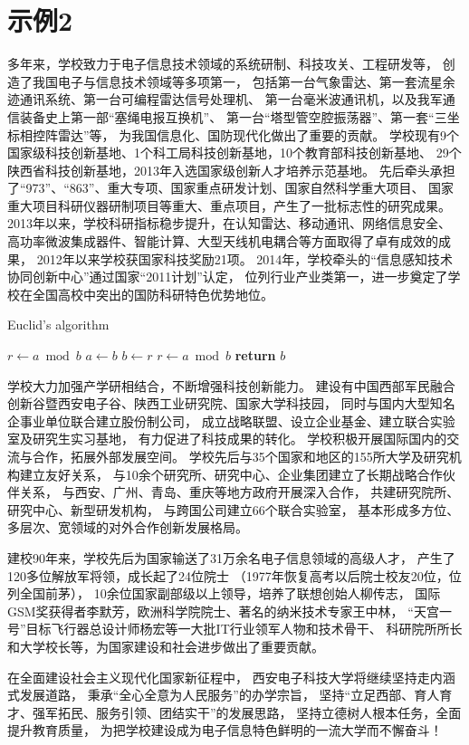 \section{示例2}
多年来，学校致力于电子信息技术领域的系统研制、科技攻关、工程研发等，
创造了我国电子与信息技术领域等多项第一，
包括第一台气象雷达、第一套流星余迹通讯系统、第一台可编程雷达信号处理机、
第一台毫米波通讯机，以及我军通信装备史上第一部“塞绳电报互换机”、
第一台“塔型管空腔振荡器”、第一套“三坐标相控阵雷达”等，
为我国信息化、国防现代化做出了重要的贡献。
学校现有9个国家级科技创新基地、1个科工局科技创新基地，10个教育部科技创新基地、
29个陕西省科技创新基地，2013年入选国家级创新人才培养示范基地。
先后牵头承担了“973”、“863”、重大专项、国家重点研发计划、国家自然科学重大项目、
国家重大项目科研仪器研制项目等重大、重点项目，产生了一批标志性的研究成果。
2013年以来，学校科研指标稳步提升，在认知雷达、移动通讯、网络信息安全、
高功率微波集成器件、智能计算、大型天线机电耦合等方面取得了卓有成效的成果，
2012年以来学校获国家科技奖励21项。
2014年，学校牵头的“信息感知技术协同创新中心”通过国家“2011计划”认定，
位列行业产业类第一，进一步奠定了学校在全国高校中突出的国防科研特色优势地位。
\begin{algorithm}
\caption{Euclid's algorithm}\label{euclid}
\begin{algorithmic}[1]
\State $r\gets a\bmod b$
\State $a\gets b$
\State $b\gets r$
\State $r\gets a\bmod b$
\EndWhile\label{euclidendwhile}
\State \textbf{return} $b$
\EndProcedure
\end{algorithmic}
\end{algorithm}
\par
学校大力加强产学研相结合，不断增强科技创新能力。
建设有中国西部军民融合创新谷暨西安电子谷、陕西工业研究院、国家大学科技园，
同时与国内大型知名企事业单位联合建立股份制公司，
成立战略联盟、设立企业基金、建立联合实验室及研究生实习基地，
有力促进了科技成果的转化。
学校积极开展国际国内的交流与合作，拓展外部发展空间。
学校先后与35个国家和地区的155所大学及研究机构建立友好关系，
与10余个研究所、研究中心、企业集团建立了长期战略合作伙伴关系，
与西安、广州、青岛、重庆等地方政府开展深入合作，
共建研究院所、研究中心、新型研发机构，
与跨国公司建立66个联合实验室，
基本形成多方位、多层次、宽领域的对外合作创新发展格局。
\par
建校90年来，学校先后为国家输送了31万余名电子信息领域的高级人才，
产生了120多位解放军将领，成长起了24位院士
（1977年恢复高考以后院士校友20位，位列全国前茅），
10余位国家副部级以上领导，培养了联想创始人柳传志，
国际GSM奖获得者李默芳，欧洲科学院院士、著名的纳米技术专家王中林，
“天宫一号”目标飞行器总设计师杨宏等一大批IT行业领军人物和技术骨干、
科研院所所长和大学校长等，为国家建设和社会进步做出了重要贡献。
\par
在全面建设社会主义现代化国家新征程中，
西安电子科技大学将继续坚持走内涵式发展道路，
秉承“全心全意为人民服务”的办学宗旨，
坚持“立足西部、育人育才、强军拓民、服务引领、团结实干”的发展思路，
坚持立德树人根本任务，全面提升教育质量，
为把学校建设成为电子信息特色鲜明的一流大学而不懈奋斗！
